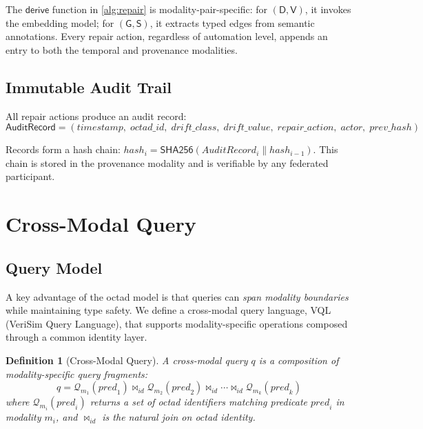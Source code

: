 \documentclass[11pt,twocolumn]{article}
\newtheorem{definition}{Definition}[section]
\newcommand{\queryfn}{\mathcal{Q}}
\begin{document}
The $\mathsf{derive}$ function in \cref{alg:repair} is modality-pair-specific:
for $(\mathsf{D}, \mathsf{V})$, it invokes the embedding model; for
$(\mathsf{G}, \mathsf{S})$, it extracts typed edges from semantic annotations.
Every repair action, regardless of automation level, appends an entry to both
the temporal and provenance modalities.

\subsection{Immutable Audit Trail}

All repair actions produce an audit record:
\[
  \mathsf{AuditRecord} = (
    \mathit{timestamp},\;
    \mathit{octad\_id},\;
    \mathit{drift\_class},\;
    \mathit{drift\_value},\;
    \mathit{repair\_action},\;
    \mathit{actor},\;
    \mathit{prev\_hash}
  )
\]

Records form a hash chain: $\mathit{hash}_i = \mathsf{SHA256}(
\mathit{AuditRecord}_i \| \mathit{hash}_{i-1})$.  This chain is stored in
the provenance modality and is verifiable by any federated participant.

\section{Cross-Modal Query}\label{sec:query}

\subsection{Query Model}

A key advantage of the octad model is that queries can \emph{span modality
boundaries} while maintaining type safety.  We define a cross-modal query
language, VQL (VeriSim Query Language), that supports modality-specific
operations composed through a common identity layer.

\begin{definition}[Cross-Modal Query]\label{def:query}
A \emph{cross-modal query} $q$ is a composition of modality-specific
query fragments:
\[
  q = \queryfn_{m_1}(\mathit{pred}_1) \bowtie_{\mathit{id}}
      \queryfn_{m_2}(\mathit{pred}_2) \bowtie_{\mathit{id}} \cdots
      \bowtie_{\mathit{id}} \queryfn_{m_k}(\mathit{pred}_k)
\]
where $\queryfn_{m_i}(\mathit{pred}_i)$ returns a set of octad identifiers
matching predicate $\mathit{pred}_i$ in modality $m_i$, and
$\bowtie_{\mathit{id}}$ is the natural join on octad identity.
\end{definition}
\end{document}
